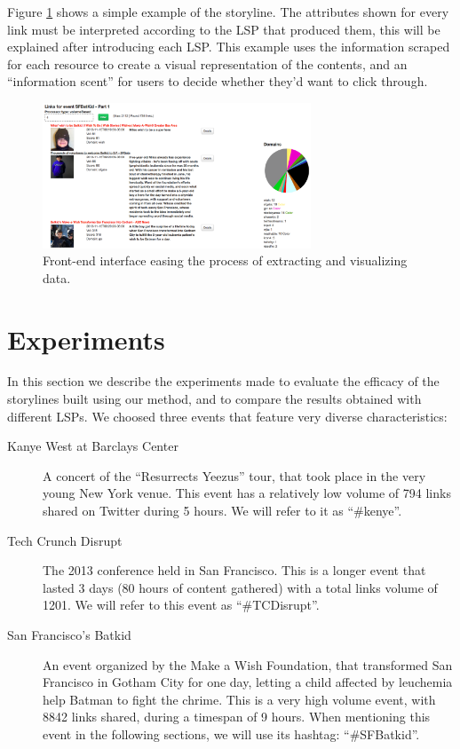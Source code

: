 \documentclass{sig-alternate}
\begin{document}
Figure \ref{fig:javascript_interface} shows a simple example of the storyline. The attributes shown for every link must be interpreted according to the LSP that produced them, this will be explained after introducing each LSP. This example uses the information scraped for each resource to create a visual representation of the contents, and an ``information scent'' for users to decide whether they'd want to click through. %
\begin{figure}[htbp]
  \centering
  \includegraphics[width=8cm]{Figures/javascript_interface.png}
  \caption{Front-end interface easing the process of extracting and visualizing data.}
  \label{fig:javascript_interface}
\end{figure}


\section{Experiments}
\label{sec:experiments}
In this section we describe the experiments made to evaluate the efficacy of the storylines built using our method, and to compare the results obtained with different LSPs. We choosed three events that feature very diverse characteristics:
\begin{description}
\item[Kanye West at Barclays Center] A concert of the ``Resurrects Yeezus'' tour, that took place in the very young New York venue. This event has a relatively low volume of 794 links shared on Twitter during 5 hours. We will refer to it as ``\#kenye''.
\item[Tech Crunch Disrupt] The 2013 conference held in San Francisco. This is a longer event that lasted 3 days (80 hours of content gathered) with a total links volume of 1201. We will refer to this event as ``\#TCDisrupt''.
\item[San Francisco's Batkid] An event organized by the Make a Wish Foundation, that transformed San Francisco in Gotham City for one day, letting a child affected by leuchemia help Batman to fight the chrime. This is a very high volume event, with 8842 links shared, during a timespan of 9 hours. When mentioning this event in the following sections, we will use its hashtag: ``\#SFBatkid''.
\end{description}
\end{document}
